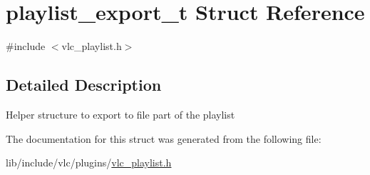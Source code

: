 \hypertarget{structplaylist__export__t}{}\section{playlist\+\_\+export\+\_\+t Struct Reference}
\label{structplaylist__export__t}


{\ttfamily \#include $<$vlc\+\_\+playlist.\+h$>$}



\subsection{Detailed Description}
Helper structure to export to file part of the playlist 

The documentation for this struct was generated from the following file\+:\begin{DoxyCompactItemize}
\item 
lib/include/vlc/plugins/\hyperlink{vlc__playlist_8h}{vlc\+\_\+playlist.\+h}\end{DoxyCompactItemize}
